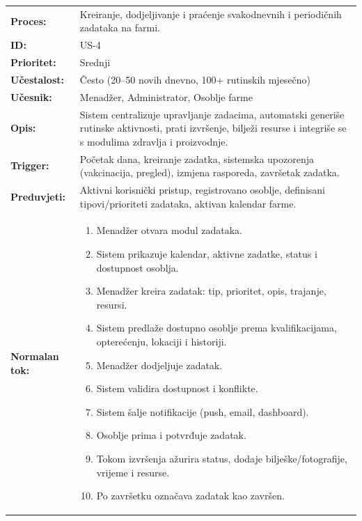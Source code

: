 \documentclass{article}
\begin{document}
\begin{table}[H]
\centering
\small
\begin{tabular}{|>{\raggedright}p{3.5cm}|>{\raggedright\arraybackslash}p{11cm}|}
\hline
\rowcolor[HTML]{B4C7E7}
\multicolumn{2}{|c|}{\textbf{US-4: Upravljanje zadacima}} \\
\hline
\textbf{Proces:} & Kreiranje, dodjeljivanje i praćenje svakodnevnih i periodičnih zadataka na farmi. \\
\hline
\textbf{ID:} & US-4 \\
\hline
\textbf{Prioritet:} & Srednji \\
\hline
\textbf{Učestalost:} & Često (20–50 novih dnevno, 100+ rutinskih mjesečno) \\
\hline
\textbf{Učesnik:} & Menadžer, Administrator, Osoblje farme \\
\hline
\textbf{Opis:} & Sistem centralizuje upravljanje zadacima, automatski generiše rutinske aktivnosti, prati izvršenje, bilježi resurse i integriše se s modulima zdravlja i proizvodnje. \\
\hline
\textbf{Trigger:} & Početak dana, kreiranje zadatka, sistemska upozorenja (vakcinacija, pregled), izmjena rasporeda, završetak zadatka. \\
\hline
\textbf{Preduvjeti:} & Aktivni korisnički pristup, registrovano osoblje, definisani tipovi/prioriteti zadataka, aktivan kalendar farme. \\
\hline
\textbf{Normalan tok:} & 
\begin{enumerate}[leftmargin=*, nosep]
    \item Menadžer otvara modul zadataka.
    \item Sistem prikazuje kalendar, aktivne zadatke, status i dostupnost osoblja.
    \item Menadžer kreira zadatak: tip, prioritet, opis, trajanje, resursi.
    \item Sistem predlaže dostupno osoblje prema kvalifikacijama, opterećenju, lokaciji i historiji.
    \item Menadžer dodjeljuje zadatak.
    \item Sistem validira dostupnost i konflikte.
    \item Sistem šalje notifikacije (push, email, dashboard).
    \item Osoblje prima i potvrđuje zadatak.
    \item Tokom izvršenja ažurira status, dodaje bilješke/fotografije, vrijeme i resurse.
    \item Po završetku označava zadatak kao završen.

\end{enumerate}
\end{tabular}
\end{table}
\end{document}
